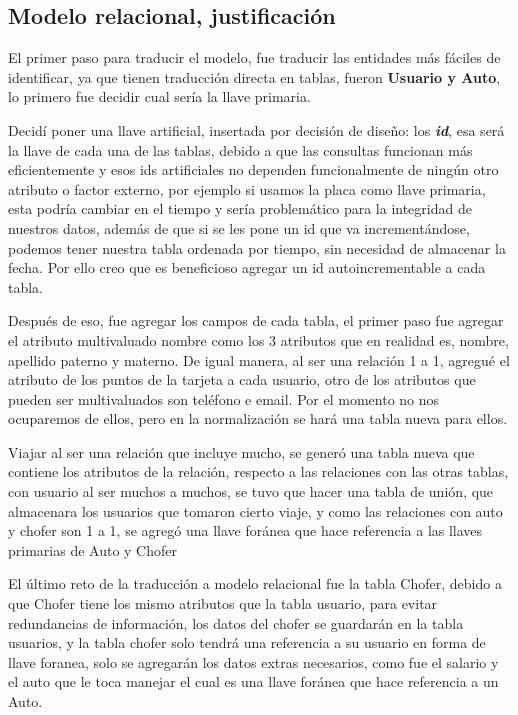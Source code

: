 \documentclass{article}
\begin{document}
\subsection{Modelo relacional, justificación}
El primer paso para traducir el modelo, fue traducir las entidades más fáciles de identificar, ya que tienen traducción directa en tablas, fueron \textbf{Usuario y Auto}, lo primero fue decidir cual sería la llave primaria.\par\null\par
Decidí poner una llave artificial, insertada por decisión de diseño: los \textbf{\textit{id}}, esa será la llave de cada una de las tablas, debido a que las consultas funcionan más eficientemente y esos ids artificiales no dependen funcionalmente de ningún otro atributo o factor externo, por ejemplo si usamos la placa como llave primaria, esta podría cambiar en el tiempo y sería problemático para la integridad de nuestros datos, además de que si se les pone un id que va incrementándose, podemos tener nuestra tabla ordenada por tiempo, sin necesidad de almacenar la fecha. Por ello creo que es beneficioso agregar un id autoincrementable a cada tabla.
\par\null\par
Después de eso, fue agregar los campos de cada tabla, el primer paso fue agregar el atributo multivaluado nombre como los 3 atributos que en realidad es, nombre, apellido paterno y materno. De igual manera, al ser una relación 1 a 1, agregué el atributo de los puntos de la tarjeta a cada usuario, otro de los atributos que pueden ser multivaluados son teléfono e email. Por el momento no nos ocuparemos de ellos, pero en la normalización se hará una tabla nueva para ellos.\par\null\par
Viajar al ser una relación que incluye mucho, se generó una tabla nueva que contiene los atributos de la relación, respecto a las relaciones con las otras tablas, con usuario al ser muchos a muchos, se tuvo que hacer una tabla de unión, que almacenara los usuarios que tomaron cierto viaje, y como las relaciones con auto y chofer son 1 a 1, se agregó una llave foránea que hace referencia a las llaves primarias de Auto y Chofer\par\null\par
El último reto de la traducción a modelo relacional fue la tabla Chofer, debido a que Chofer tiene los mismo atributos que la tabla usuario, para evitar redundancias de información, los datos del chofer se guardarán en la tabla usuarios, y la tabla chofer solo tendrá una referencia a su usuario en forma de llave foranea, solo se agregarán los datos extras necesarios, como fue el salario y el auto que le toca manejar el cual es una llave foránea que hace referencia a un Auto.
\end{document}

